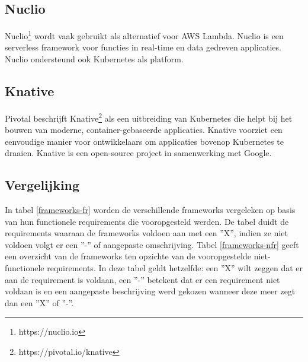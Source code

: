 \subsection{Nuclio}
Nuclio\footnote{https://nuclio.io} wordt vaak gebruikt als alternatief voor AWS Lambda. Nuclio is een serverless framework voor functies in real-time en data gedreven applicaties. Nuclio ondersteund ook Kubernetes als platform. \autocite{Nuclio2019}

\subsection{Knative}
Pivotal beschrijft Knative\footnote{https://pivotal.io/knative} als een uitbreiding van Kubernetes die helpt bij het bouwen van moderne, container-gebaseerde applicaties. Knative voorziet een eenvoudige manier voor ontwikkelaars om applicaties bovenop Kubernetes te draaien. Knative is een open-source project in samenwerking met Google.

\subsection{Vergelijking}
In tabel \ref{frameworks-fr} worden de verschillende frameworks vergeleken op basis van hun functionele requirements die vooropgesteld  werden.  De tabel duidt de requirements waaraan de frameworks voldoen aan met een ''X'', indien ze niet voldoen volgt er een ''-'' of aangepaste omschrijving. Tabel \ref{frameworks-nfr} geeft een overzicht van de frameworks ten opzichte van de vooropgestelde niet-functionele requirements. In deze tabel geldt hetzelfde: een ''X'' wilt zeggen dat er aan de requirement is voldaan, een ''-'' betekent dat er een requirement niet voldaan is en een aangepaste beschrijving werd gekozen wanneer deze meer zegt dan een ''X'' of ''-''.


